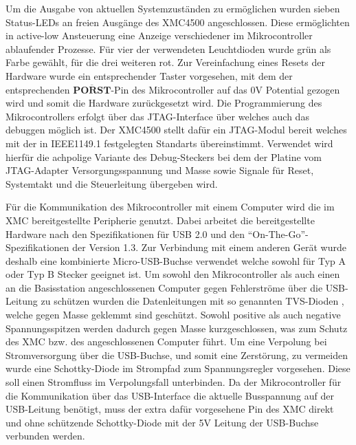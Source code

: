 Um die Ausgabe von aktuellen Systemzuständen zu ermöglichen wurden sieben Status-LEDs an freien Ausgänge des XMC4500  angeschlossen. Diese ermöglichten in active-low Ansteuerung eine Anzeige verschiedener im Mikrocontroller ablaufender Prozesse. Für vier der verwendeten Leuchtdioden wurde grün als Farbe gewählt, für die drei weiteren rot. Zur Vereinfachung eines Resets der Hardware wurde ein entsprechender Taster vorgesehen, mit dem der entsprechenden  $\overline{\textbf{PORST}}$-Pin des Mikrocontroller auf das 0V Potential gezogen wird und somit die Hardware zurückgesetzt wird.
Die Programmierung des Mikrocontrollers erfolgt über das \ac{JTAG}-Interface über welches auch das debuggen möglich ist. Der XMC4500 stellt dafür ein \ac{JTAG}-Modul bereit welches mit der in IEEE1149.1 festgelegten Standarts übereinstimmt. Verwendet wird hierfür die achpolige Variante des Debug-Steckers bei dem der Platine vom \ac{JTAG}-Adapter Versorgungsspannung und Masse sowie Signale für Reset, Systemtakt und die Steuerleitung übergeben wird.  %


Für die Kommunikation des Mikrocontroller mit einem Computer wird die im XMC  bereitgestellte Peripherie genutzt. Dabei arbeitet die bereitgestellte Hardware nach den Spezifikationen für USB 2.0 und den \enquote{On-The-Go}-Spezifikationen der Version 1.3. Zur Verbindung mit einem anderen Gerät wurde deshalb eine kombinierte Micro-USB-Buchse verwendet welche sowohl für Typ A oder Typ B Stecker geeignet ist.
Um sowohl den Mikrocontroller als auch einen an die Basisstation angeschlossenen Computer gegen Fehlerströme über die USB-Leitung zu schützen wurden die Datenleitungen mit so genannten \ac{TVS}-Dioden , welche gegen Masse geklemmt sind geschützt. Sowohl positive als auch negative Spannungsspitzen werden dadurch gegen Masse kurzgeschlossen, was zum Schutz des XMC bzw. des angeschlossenen Computer führt. Um eine Verpolung bei Stromversorgung über die USB-Buchse, und somit eine Zerstörung, zu vermeiden wurde eine Schottky-Diode im Strompfad zum Spannungsregler vorgesehen. Diese soll einen Stromfluss im Verpolungsfall unterbinden. Da der Mikrocontroller für die Kommunikation über das USB-Interface die aktuelle Busspannung auf der USB-Leitung benötigt, muss der extra dafür vorgesehene Pin des XMC direkt und ohne schützende Schottky-Diode mit der 5V Leitung der USB-Buchse verbunden werden.


